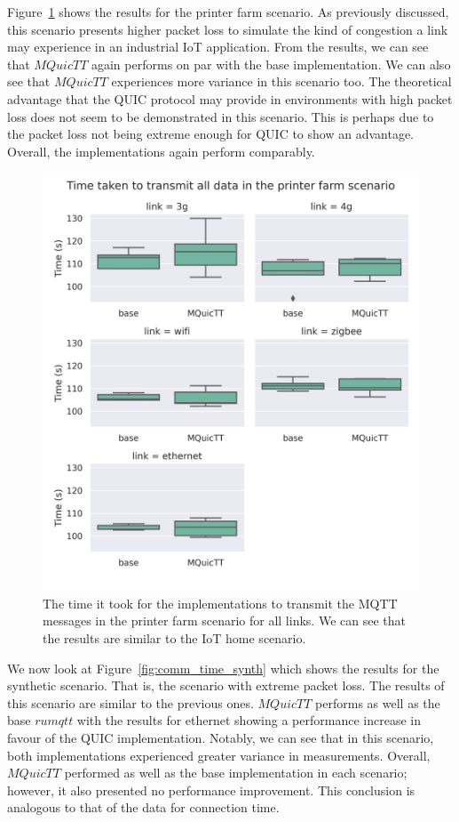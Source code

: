 Figure~\ref{fig:comm_time_farm} shows the results for the printer farm scenario.
As previously discussed, this scenario presents higher packet loss to simulate the kind of congestion a link may experience in an industrial IoT application.
From the results, we can see that $MQuicTT$ again performs on par with the base implementation.
We can also see that $MQuicTT$ experiences more variance in this scenario too.
The theoretical advantage that the QUIC protocol may provide in environments with high packet loss does not seem to be demonstrated in this scenario.
This is perhaps due to the packet loss not being extreme enough for QUIC to show an advantage.
Overall, the implementations again perform comparably.

\begin{figure}
    \centering
    \includegraphics[width=1\linewidth]{images/analysis_comm_time_farm.png}
    \caption{The time it took for the implementations to transmit the MQTT messages in the printer farm scenario for all links.
        We can see that the results are similar to the IoT home scenario.}
    \label{fig:comm_time_farm}
\end{figure}

We now look at Figure~\ref{fig:comm_time_synth} which shows the results for the synthetic scenario.
That is, the scenario with extreme packet loss.
The results of this scenario are similar to the previous ones.
$MQuicTT$ performs as well as the base $rumqtt$ with the results for ethernet showing a performance increase in favour of the QUIC implementation.
Notably, we can see that in this scenario, both implementations experienced greater variance in measurements.
Overall, $MQuicTT$ performed as well as the base implementation in each scenario; however, it also presented no performance improvement.
This conclusion is analogous to that of the data for connection time.

